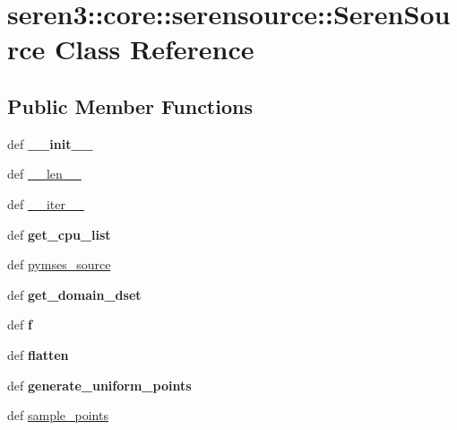 \hypertarget{classseren3_1_1core_1_1serensource_1_1SerenSource}{
\section{seren3::core::serensource::SerenSource Class Reference}
\label{classseren3_1_1core_1_1serensource_1_1SerenSource}
}
\subsection*{Public Member Functions}
\begin{DoxyCompactItemize}
\item 
\hypertarget{classseren3_1_1core_1_1serensource_1_1SerenSource_abc26731d61dbbe26b6280cd88741d67c}{
def {\bfseries \_\-\_\-init\_\-\_\-}}
\label{classseren3_1_1core_1_1serensource_1_1SerenSource_abc26731d61dbbe26b6280cd88741d67c}

\item 
def \hyperlink{classseren3_1_1core_1_1serensource_1_1SerenSource_a2c076629af25ef6fc19e35d8d0243b16}{\_\-\_\-len\_\-\_\-}
\item 
def \hyperlink{classseren3_1_1core_1_1serensource_1_1SerenSource_a6120e621edc47b56093722ef74f9188d}{\_\-\_\-iter\_\-\_\-}
\item 
\hypertarget{classseren3_1_1core_1_1serensource_1_1SerenSource_a3339fbdcbb895c2bbaa39d6f73ebfd86}{
def {\bfseries get\_\-cpu\_\-list}}
\label{classseren3_1_1core_1_1serensource_1_1SerenSource_a3339fbdcbb895c2bbaa39d6f73ebfd86}

\item 
def \hyperlink{classseren3_1_1core_1_1serensource_1_1SerenSource_ad2b95278d90d79af64d3c84d7add15df}{pymses\_\-source}
\item 
\hypertarget{classseren3_1_1core_1_1serensource_1_1SerenSource_a6a0c7f6fdcb120d9f5545d45ed5333f3}{
def {\bfseries get\_\-domain\_\-dset}}
\label{classseren3_1_1core_1_1serensource_1_1SerenSource_a6a0c7f6fdcb120d9f5545d45ed5333f3}

\item 
\hypertarget{classseren3_1_1core_1_1serensource_1_1SerenSource_abe6bde941307b5b13604b25708741e8a}{
def {\bfseries f}}
\label{classseren3_1_1core_1_1serensource_1_1SerenSource_abe6bde941307b5b13604b25708741e8a}

\item 
\hypertarget{classseren3_1_1core_1_1serensource_1_1SerenSource_a83fcfc49f068dd7b0efc47fb803a3a1c}{
def {\bfseries flatten}}
\label{classseren3_1_1core_1_1serensource_1_1SerenSource_a83fcfc49f068dd7b0efc47fb803a3a1c}

\item 
\hypertarget{classseren3_1_1core_1_1serensource_1_1SerenSource_a9f5180697841315bf5a2757e7ed53162}{
def {\bfseries generate\_\-uniform\_\-points}}
\label{classseren3_1_1core_1_1serensource_1_1SerenSource_a9f5180697841315bf5a2757e7ed53162}

\item 
def \hyperlink{classseren3_1_1core_1_1serensource_1_1SerenSource_ab3c3cdcbdca294f4336f425eb9d762e5}{sample\_\-points}
\end{DoxyCompactItemize}
